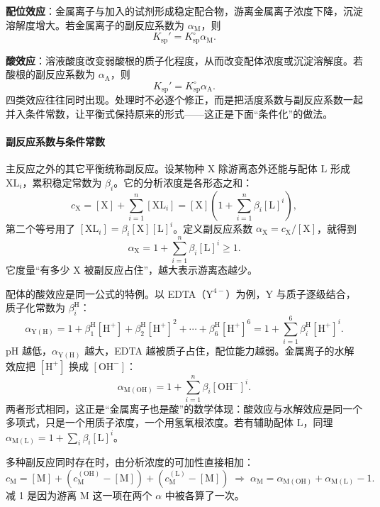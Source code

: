 \documentclass[UTF8]{ctexbook}
\begin{document}
\textbf{配位效应}：金属离子与加入的试剂形成稳定配合物，游离金属离子浓度下降，沉淀溶解度增大。若金属离子的副反应系数为 \(\alpha_{\mathrm{M}}\)，则
\[
K_{\mathrm{sp}}'=K_{\mathrm{sp}}^\circ\alpha_{\mathrm{M}}.
\]

\textbf{酸效应}：溶液酸度改变弱酸根的质子化程度，从而改变配体浓度或沉淀溶解度。若酸根的副反应系数为 \(\alpha_{\mathrm{A}}\)，则
\[
K_{\mathrm{sp}}'=K_{\mathrm{sp}}^\circ\alpha_{\mathrm{A}}.
\]
四类效应往往同时出现。处理时不必逐个修正，而是把活度系数与副反应系数一起并入条件常数，让平衡式保持原来的形式——这正是下面“条件化”的做法。

\paragraph{副反应系数与条件常数}

主反应之外的其它平衡统称副反应。设某物种 \(\mathrm{X}\) 除游离态外还能与配体 \(\mathrm{L}\) 形成 \(\mathrm{XL}_i\)，累积稳定常数为 \(\beta_i\)。它的分析浓度是各形态之和：
\[
c_{\mathrm{X}}=[\mathrm{X}]+\sum_{i=1}^{n}[\mathrm{XL}_i]
=[\mathrm{X}]\left(1+\sum_{i=1}^{n}\beta_i[\mathrm{L}]^i\right),
\]
第二个等号用了 \([\mathrm{XL}_i]=\beta_i[\mathrm{X}][\mathrm{L}]^i\)。定义副反应系数 \(\alpha_{\mathrm{X}}=c_{\mathrm{X}}/[\mathrm{X}]\)，就得到
\[
\alpha_{\mathrm{X}}=1+\sum_{i=1}^{n}\beta_i[\mathrm{L}]^i\ge1 .
\]
它度量“有多少 \(\mathrm{X}\) 被副反应占住”，越大表示游离态越少。

配体的酸效应是同一公式的特例。以 EDTA（\(\mathrm{Y^{4-}}\)）为例，\(\mathrm{Y}\) 与质子逐级结合，质子化常数为 \(\beta_i^{\mathrm{H}}\)：
\[
\alpha_{\mathrm{Y(H)}}=1+\beta_1^{\mathrm{H}}[\mathrm{H^+}]+\beta_2^{\mathrm{H}}[\mathrm{H^+}]^2+\cdots+\beta_6^{\mathrm{H}}[\mathrm{H^+}]^6
=1+\sum_{i=1}^{6}\beta_i^{\mathrm{H}}[\mathrm{H^+}]^i.
\]
\(\mathrm{pH}\) 越低，\(\alpha_{\mathrm{Y(H)}}\) 越大，EDTA 越被质子占住，配位能力越弱。金属离子的水解效应把 \([\mathrm{H^+}]\) 换成 \([\mathrm{OH^-}]\)：
\[
\alpha_{\mathrm{M(OH)}}=1+\sum_{i=1}^{n}\beta_i[\mathrm{OH^-}]^i.
\]
两者形式相同，这正是“金属离子也是酸”的数学体现：酸效应与水解效应是同一个多项式，只是一个用质子浓度，一个用氢氧根浓度。若有辅助配体 \(\mathrm{L}\)，同理 \(\alpha_{\mathrm{M(L)}}=1+\sum_i\beta_i[\mathrm{L}]^i\)。

多种副反应同时存在时，由分析浓度的可加性直接相加：
\[
c_{\mathrm{M}}=[\mathrm{M}]+(c_{\mathrm{M}}^{\mathrm{(OH)}}-[\mathrm{M}])+(c_{\mathrm{M}}^{\mathrm{(L)}}-[\mathrm{M}])
\;\Longrightarrow\;
\alpha_{\mathrm{M}}=\alpha_{\mathrm{M(OH)}}+\alpha_{\mathrm{M(L)}}-1 .
\]
减 1 是因为游离 \(\mathrm{M}\) 这一项在两个 \(\alpha\) 中被各算了一次。
\end{document}
